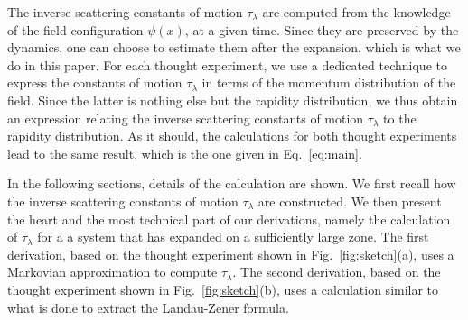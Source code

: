 \documentclass[submission,Phys,10pt]{SciPost}%
\begin{document}
The inverse scattering constants of motion $\tau_\lambda$ are computed from the knowledge of the field configuration $\psi(x)$, at a given time.  Since they are preserved by the dynamics, one can choose to estimate them after the expansion, which is what we do in this paper. For each thought experiment, we use a dedicated technique to express the constants of motion  $\tau_\lambda$ in terms of the momentum distribution of the field. Since the latter is nothing else but the rapidity distribution, we thus obtain an expression relating the 
inverse scattering constants of motion $\tau_\lambda$ to the rapidity distribution. As it should, the calculations for both thought experiments
lead to the same result, which is the one given in Eq.~\eqref{eq:main}. 


 
 In the following sections, details of the calculation are shown. We first recall how the
 inverse scattering constants of motion $\tau_\lambda$ are constructed.
 We then present the heart and the most technical part of our derivations,
 namely the calculation of $\tau_\lambda$  for a a system that has
 expanded on a sufficiently large zone. The first derivation, based on the thought experiment shown in Fig.~\ref{fig:sketch}(a), uses a Markovian approximation to compute $\tau_\lambda$.  The second derivation, based on the thought experiment shown in Fig.~\ref{fig:sketch}(b), uses a calculation similar to what is  done to extract the Landau-Zener formula. 


 
 
\end{document}
